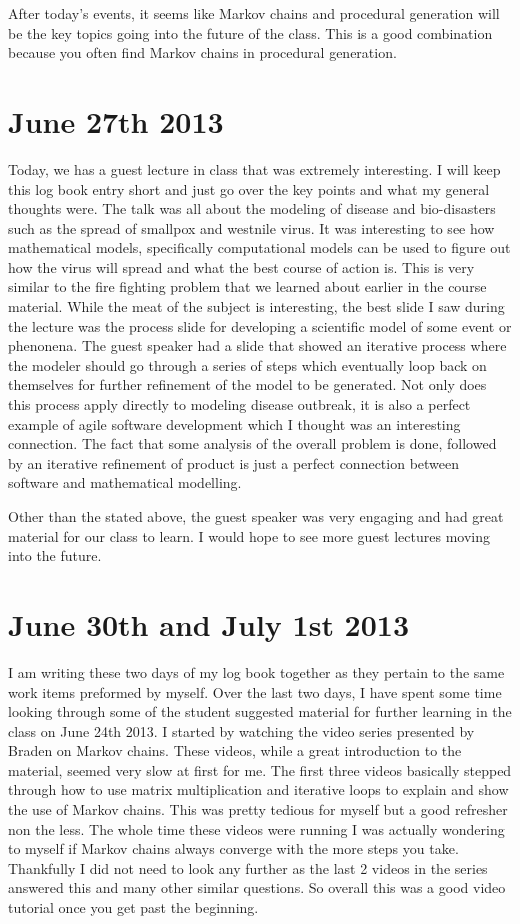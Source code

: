 \documentclass[conference]{IEEEtran}
\begin{document}
After today's events, it seems like Markov chains and procedural generation will be the key topics going into
the future of the class. This is a good combination because you often find Markov chains in procedural generation.

\section{June 27th 2013}
Today, we has a guest lecture in class that was extremely interesting. I will keep this log book entry short
and just go over the key points and what my general thoughts were. The talk was all about the modeling of disease
and bio-disasters such as the spread of smallpox and westnile virus. It was interesting to see how mathematical
models, specifically computational models can be used to figure out how the virus will spread and what the best
course of action is. This is very similar to the fire fighting problem that we learned about earlier in the course
material. While the meat of the subject is interesting, the best slide I saw during the lecture was the process
slide for developing a scientific model of some event or phenonena. The guest speaker had a slide that showed an
iterative process where the modeler should go through a series of steps which eventually loop back on themselves
for further refinement of the model to be generated. Not only does this process apply directly to modeling
disease outbreak, it is also a perfect example of agile software development which I thought was an interesting
connection. The fact that some analysis of the overall problem is done, followed by an iterative refinement of
product is just a perfect connection between software and mathematical modelling. 

Other than the stated above, the guest speaker was very engaging and had great material for our class to learn.
I would hope to see more guest lectures moving into the future.

\section{June 30th and July 1st 2013}
I am writing these two days of my log book together as they pertain to the same work items preformed by myself.
Over the last two days, I have spent some time looking through some of the student suggested material for further
learning in the class on June 24th 2013. I started by watching the video series presented by Braden on Markov chains.
These videos, while a great introduction to the material, seemed very slow at first for me. The first three videos
basically stepped through how to use matrix multiplication and iterative loops to explain and show the use of
Markov chains. This was pretty tedious for myself but a good refresher non the less. The whole time these videos
were running I was actually wondering to myself if Markov chains always converge with the more steps you take.
Thankfully I did not need to look any further as the last 2 videos in the series answered this and many other
similar questions. So overall this was a good video tutorial once you get past the beginning.
\end{document}
